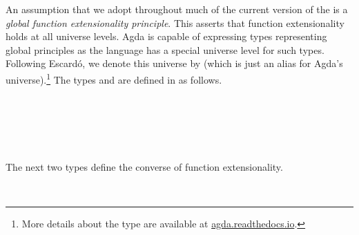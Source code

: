 An assumption that we adopt throughout much of the current version of the \ualib is a \emph{global function extensionality principle}. This asserts that function extensionality holds at all universe levels. Agda is capable of expressing types representing global principles as the language has a special universe level for such types.
Following Escardó, we denote this universe by  (which is just an alias for Agda's  universe).\footnote{More details about the  type are available at
\href{https://agda.readthedocs.io/en/latest/language/universe-levels.html\#expressions-of-kind-set}{agda.readthedocs.io}.}
The types  and  are defined in \typtop as follows.
\ccpad
\begin{code}%
\>[1]\AgdaSpace{}%
\AgdaSymbol{:}\AgdaSpace{}%
\<%
\\
%
\>[1]\AgdaSpace{}%
\AgdaSymbol{=}\AgdaSpace{}%
%
\>[20]\AgdaSymbol{\{}\AgdaSpace{}%
\AgdaSymbol{\}}\AgdaSpace{}%
\AgdaSpace{}%
\AgdaSpace{}%
\AgdaSpace{}%
\<%
\\
%
\\[\AgdaEmptyExtraSkip]%
%
\>[1]\AgdaSpace{}%
\AgdaSymbol{:}\AgdaSpace{}%
\<%
\\
%
\>[1]\AgdaSpace{}%
\AgdaSymbol{=}\AgdaSpace{}%
\AgdaSpace{}%
\AgdaSymbol{\{}\AgdaSpace{}%
\AgdaSymbol{\}}\AgdaSpace{}%
\AgdaSpace{}%
\AgdaSpace{}%
\AgdaSpace{}%
\<%
\end{code}
\ccpad
The next two types define the converse of function extensionality.
\ccpad
\begin{code}%
\>[1]\AgdaSpace{}%
\AgdaSymbol{:}\AgdaSpace{}%
\AgdaSymbol{\{}\AgdaSpace{}%
\AgdaSymbol{:}\AgdaSpace{}%
\AgdaSpace{}%
\AgdaSymbol{\}\{}\AgdaSpace{}%
\AgdaSymbol{:}\AgdaSpace{}%
\AgdaSpace{}%
\AgdaSymbol{\}\{}\AgdaSpace{}%
\AgdaSpace{}%
\AgdaSymbol{:}\AgdaSpace{}%
\AgdaSpace{}%
\AgdaSpace{}%
\AgdaSymbol{\}}\AgdaSpace{}%
\AgdaSpace{}%
\AgdaSpace{}%
\AgdaSpace{}%
%
\>[51]%
\>[54]\AgdaSpace{}%
\AgdaSpace{}%
\<%
\\
%
\>[1]\AgdaSpace{}%
\AgdaSpace{}%
\AgdaSymbol{\AgdaUnderscore{}}\AgdaSpace{}%
\AgdaSymbol{=}\AgdaSpace{}%
\<%
\end{code}
